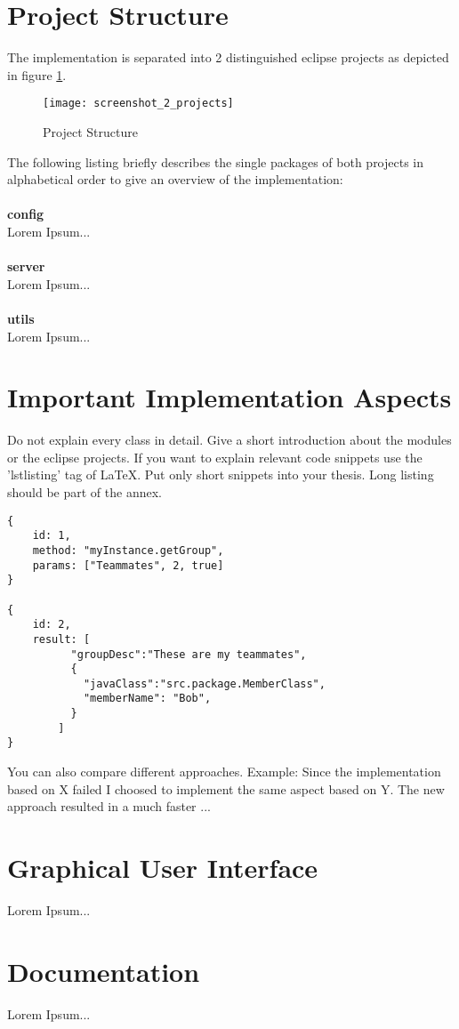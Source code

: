 \section{Project Structure\label{sec:projectstructure}}

The implementation is separated into 2 distinguished eclipse projects as depicted in figure \ref{fig:projects}.

\begin{figure}[htb]
  \centering
  \texttt{[image: screenshot\_2\_projects]}
  \caption{Project Structure}
  \label{fig:projects}
\end{figure}

\noindent
The following listing briefly describes the single packages of both projects in alphabetical order to give an overview of the implementation:
\\
\\
\textbf{config} 
\\
Lorem Ipsum...
\\
\\
\textbf{server} 
\\
Lorem Ipsum...
\\
\\
\textbf{utils} 
\\
Lorem Ipsum...

\section{Important Implementation Aspects\label{sec:implaspects}}

Do not explain every class in detail. Give a short introduction about the modules or the eclipse projects. If you want to explain relevant code snippets use the 'lstlisting' tag of LaTeX. Put only short snippets into your thesis. Long listing should be part of the annex.

\lstset{caption=JSON String Code Snippet,label=jsonstring,showstringspaces=false}
\begin{lstlisting}
{
	id: 1,
	method: "myInstance.getGroup",
	params: ["Teammates", 2, true]
}

{
	id: 2,
	result: [
		  "groupDesc":"These are my teammates",
		  {
			"javaClass":"src.package.MemberClass",
			"memberName": "Bob",      
		  }
		]
}\end{lstlisting}

You can also compare different approaches. Example: Since the implementation based on X failed I choosed to implement the same aspect based on Y. The new approach resulted in a much faster ...

\section{Graphical User Interface\label{sec:gui}}

Lorem Ipsum...

\section{Documentation\label{sec:docu}}

Lorem Ipsum...


